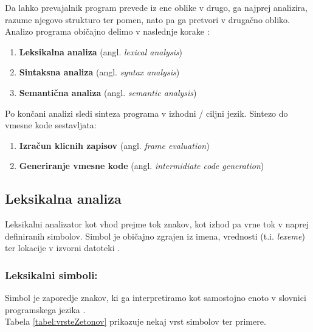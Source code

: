 \documentclass[a4paper, 12p]{book}
\begin{document}
Da lahko prevajalnik program prevede iz ene oblike v drugo, ga najprej analizira, razume njegovo strukturo ter pomen, nato pa ga pretvori v drugačno obliko.  \\
Analizo programa običajno delimo v naslednje korake \cite{modernCompiler}:
\begin{enumerate}
	\item \textbf{Leksikalna analiza} (angl. \textit{lexical analysis})
	\item \textbf{Sintaksna analiza} (angl. \textit{syntax analysis})
	\item \textbf{Semantična analiza} (angl. \textit{semantic analysis})
\end{enumerate}

Po končani analizi sledi sinteza programa v izhodni / ciljni jezik. Sintezo do vmesne kode sestavljata:
\begin{enumerate}
	\item \textbf{Izračun klicnih zapisov} (angl. \textit{frame evaluation})
	\item \textbf{Generiranje vmesne kode} (angl. \textit{intermidiate code generation})
\end{enumerate}

\subsection{Leksikalna analiza}

Leksikalni analizator kot vhod prejme tok znakov, kot izhod pa vrne tok v naprej definiranih simbolov. Simbol je običajno zgrajen iz imena, vrednosti (t.i. \textit{lexeme}) ter lokacije v izvorni datoteki \cite{modernCompiler}.

\subsubsection{Leksikalni simboli:}

Simbol je zaporedje znakov, ki ga interpretiramo kot samostojno enoto v slovnici programskega jezika \cite{modernCompiler}. \\ 
Tabela \ref{tabel:vrsteZetonov} prikazuje nekaj vrst simbolov ter primere. \\
\end{document}
